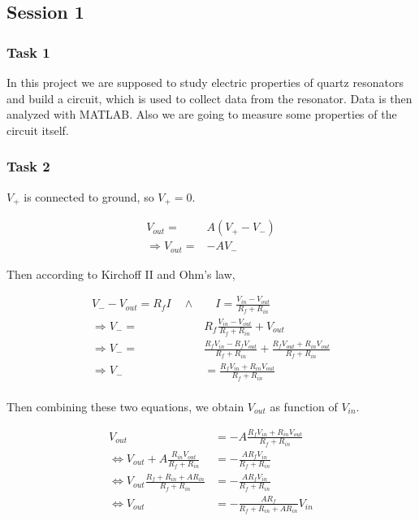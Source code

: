 \documentclass[12pt]{article}
\begin{document}
\subsection{Session 1}

\subsubsection{Task 1}

In this project we are supposed to study electric properties of quartz resonators and build a circuit, which is used to collect data from the resonator. Data is then analyzed with MATLAB. Also we are going to measure some properties of the circuit itself.

\subsubsection{Task 2} \label{sec:voltamp}

$V_+$ is connected to ground, so $V_+ = 0$.

\begin{align*}
V_{out} =& A(V_+ - V_-) \\
\Rightarrow V_{out} =& -AV_-
\end{align*}

Then according to Kirchoff II and Ohm's law,

\begin{align*}
V_- - V_{out} = R_f I \quad \wedge & \quad I = \frac{V_{in} - V_{out}}{R_f + R_{in}} \\
\Rightarrow V_- =& R_f \frac{V_{in} - V_{out}}{R_f + R_{in}} + V_{out} \\
\Rightarrow V_- =& \frac{R_f V_{in} - R_f V_{out}}{R_f + R_{in}} + \frac{R_f V_{out} + R_{in} V_{out}}{R_f + R_{in}} \\
\Rightarrow V_- &= \frac{R_f V_{in} + R_{in} V_{out}}{R_f + R_{in}} \\
\end{align*}

Then combining these two equations, we obtain $V_{out}$ as function of $V_{in}$.

\begin{align*}
V_{out} &= -A\frac{R_f V_{in} + R_{in} V_{out}}{R_f + R_{in}} \\
\Leftrightarrow V_{out} + A\frac{R_{in} V_{out}}{R_f + R_{in}} &= -\frac{A R_f V_{in}}{R_f + R_{in}} \\
\Leftrightarrow V_{out}\frac{R_f + R_{in} + A R_{in}}{R_f + R_{in}} &= -\frac{A R_f V_{in}}{R_f + R_{in}} \\
\Leftrightarrow V_{out} &= -\frac{A R_f}{R_f + R_{in} + A R_{in}} V_{in}
\end{align*}
\end{document}
